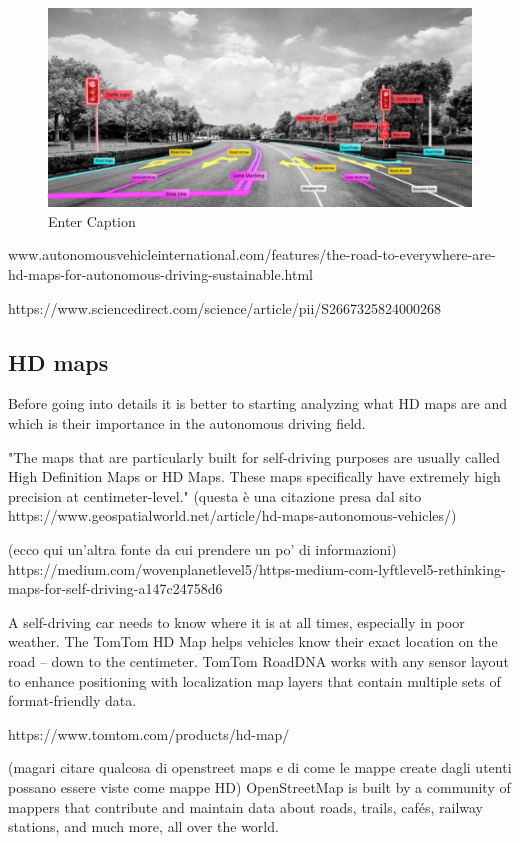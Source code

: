 \begin{figure}
    \centering
    \includegraphics[width=1\linewidth]{LateX/figs/35493487c9d025c81f4e9ed21722d458_1612794598859.jpg}
    \caption{Enter Caption}
    \label{fig:enter-label}
\end{figure}


www.autonomousvehicleinternational.com/features/the-road-to-everywhere-are-hd-maps-for-autonomous-driving-sustainable.html 

https://www.sciencedirect.com/science/article/pii/S2667325824000268

\subsection{HD maps}
Before going into details it is better to starting analyzing what HD maps are and which is their importance in the autonomous driving field. 

"The maps that are particularly built for self-driving purposes are usually called High Definition Maps or HD Maps. These maps specifically have extremely high precision at centimeter-level." (questa è una citazione presa dal sito https://www.geospatialworld.net/article/hd-maps-autonomous-vehicles/)

(ecco qui un'altra fonte da cui prendere un po' di informazioni)
https://medium.com/wovenplanetlevel5/https-medium-com-lyftlevel5-rethinking-maps-for-self-driving-a147c24758d6

A self-driving car needs to know where it is at all times, especially in poor weather. The TomTom HD Map helps vehicles know their exact location on the road – down to the centimeter. TomTom RoadDNA works with any sensor layout to enhance positioning with localization map layers that contain multiple sets of format-friendly data.

https://www.tomtom.com/products/hd-map/

(magari citare qualcosa di openstreet maps e di come le mappe create dagli utenti possano essere viste come mappe HD)
OpenStreetMap is built by a community of mappers that contribute and maintain data about roads, trails, cafés, railway stations, and much more, all over the world.

